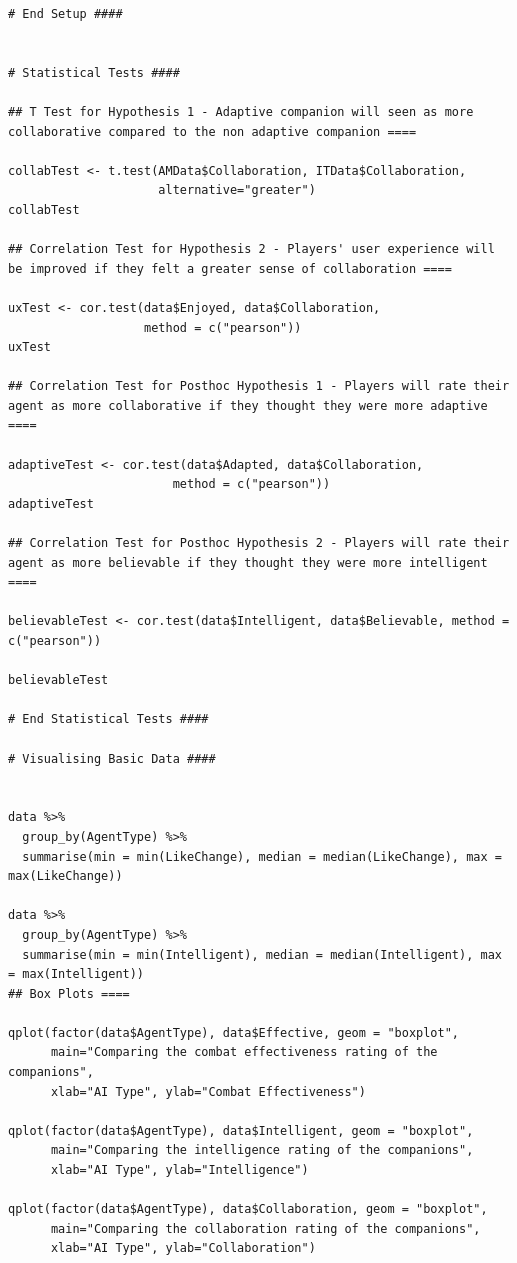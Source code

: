 \documentclass{IEEEtran}
\begin{document}
\begin{verbatim}
# End Setup ####


# Statistical Tests ####

## T Test for Hypothesis 1 - Adaptive companion will seen as more collaborative compared to the non adaptive companion ====

collabTest <- t.test(AMData$Collaboration, ITData$Collaboration, 
                     alternative="greater")
collabTest

## Correlation Test for Hypothesis 2 - Players' user experience will be improved if they felt a greater sense of collaboration ====

uxTest <- cor.test(data$Enjoyed, data$Collaboration,
                   method = c("pearson"))
uxTest

## Correlation Test for Posthoc Hypothesis 1 - Players will rate their agent as more collaborative if they thought they were more adaptive ====

adaptiveTest <- cor.test(data$Adapted, data$Collaboration,
                       method = c("pearson"))
adaptiveTest

## Correlation Test for Posthoc Hypothesis 2 - Players will rate their agent as more believable if they thought they were more intelligent ====

believableTest <- cor.test(data$Intelligent, data$Believable, method = c("pearson"))

believableTest

# End Statistical Tests ####

# Visualising Basic Data ####


data %>%
  group_by(AgentType) %>%
  summarise(min = min(LikeChange), median = median(LikeChange), max = max(LikeChange))

data %>%
  group_by(AgentType) %>%
  summarise(min = min(Intelligent), median = median(Intelligent), max = max(Intelligent))
## Box Plots ====

qplot(factor(data$AgentType), data$Effective, geom = "boxplot", 
      main="Comparing the combat effectiveness rating of the companions", 
      xlab="AI Type", ylab="Combat Effectiveness")

qplot(factor(data$AgentType), data$Intelligent, geom = "boxplot", 
      main="Comparing the intelligence rating of the companions", 
      xlab="AI Type", ylab="Intelligence")

qplot(factor(data$AgentType), data$Collaboration, geom = "boxplot", 
      main="Comparing the collaboration rating of the companions", 
      xlab="AI Type", ylab="Collaboration")


\end{verbatim}
\end{document}
